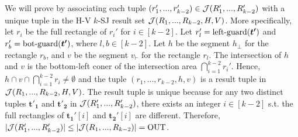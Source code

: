 
 We will prove by associating each tuple $(r_1',...,r_{k-2}')\in \mathcal{J}(R_1',...,R_{k-2}')$ with a unique tuple in the H-V $k$-SJ result set $\mathcal{J}(R_1,...,R_{k-2},H,V)$. More specifically, let $r_i$ be the full rectangle of $r_i'$ for $i\in[k-2]$. Let $r'_l = \mathrm{left\text{-}guard}(\textrm{\boldmath${t'}$})$ and $r'_b = \mathrm{bot\text{-}guard}(\textrm{\boldmath${t'}$})$, where $l,b\in[k-2]$. Let $h$ be the segment $h_\bot$ for the rectangle $r_b$, and $v$ be the segment $v_\vdash$ for the rectangle $r_l$. The intersection of $h$ and $v$ is the bottom-left coner of the intersection area $\bigcap_{i = 1}^{k-2}r_i'$. Hence, $h\cap v\cap \bigcap_{i = 1}^{k-2}r_i \neq \emptyset$ and the tuple $(r_1,...,r_{k-2},h,v)$ is a result tuple in $\mathcal{J}(R_1,...,R_{k-2},H,V)$. The result tuple is unique because for any two distinct tuples $\bm{t'_1}$ and $\bm{t'_2}$ in $\mathcal{J}(R_1',...,R_{k-2}')$, there exists an integer $i \in [k-2]$ s.t. the full rectangles of $\bm{t_1'}[i]$ and $\bm{t_2'}[i]$ are different. Therefore, $|\mathcal{J}(R_1',...,R_{k-2}')| \leq |\mathcal{J}(R_1,...,R_{k-2})| = \mathrm{OUT}$.
